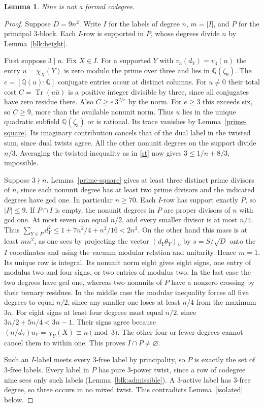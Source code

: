 \documentclass[11pt]{amsart}
\numberwithin{equation}{section}
\newtheorem{lemma}[theorem]{Lemma}
\begin{document}
\begin{lemma}\label{nine}
Nine is not a formal codegree.
\end{lemma}
\begin{proof}
Suppose $D=9n^2$. Write $I$ for the labels of degree $n$, $m=|I|$,
and $P$ for the principal 3-block. Each $I$-row is supported in $P$,
whose degrees divide $n$ by Lemma~\ref{blk:height}.

First suppose $3\mid n$. Fix $X\in I$. For a supported $Y$ with
$v_3(d_Y)=v_3(n)$ the entry $u=\chi_X(Y)$ is zero modulo the
prime over three and lies in $\mathbb Q(\zeta_9)$.
The $e=[\mathbb Q(u):\mathbb Q]$ conjugate entries occur at distinct
columns. For $u\ne0$ their total cost $C=\operatorname{Tr}(u\bar u)$
is a positive integer divisible by three, since all conjugates have
zero residue there. Also $C\ge e\,3^{2/e}$ by the norm. For $e\ge3$
this exceeds six, so $C\ge9$, more than the available nonunit norm.
Thus $u$ lies in the unique quadratic subfield $\mathbb Q(\zeta_3)$
or is rational. Its trace vanishes by Lemma~\ref{prime-square}.
Its imaginary contribution cancels that
of the dual label in the twisted sum, since dual twists agree.
All the other nonunit degrees on the support divide $n/3$.
Averaging the twisted inequality as in \eqref{st} now gives
$3\le1/n+8/3$, impossible.

Suppose $3\nmid n$. Lemma~\ref{prime-square} gives at least three
distinct prime divisors of $n$, since each nonunit degree has at
least two prime divisors and the indicated degrees have gcd one.
In particular $n\ge70$. Each $I$-row has support exactly $P$,
so $|P|\le9$. If $P\cap I$ is empty, the nonunit degrees in $P$
are proper divisors of $n$ with gcd one. At most seven can equal
$n/2$, and every smaller divisor is at most $n/4$. Thus
$\sum_{Y\in P}d_Y^2\le1+7n^2/4+n^2/16<2n^2$.
On the other hand this mass is at least $mn^2$, as one sees by projecting the vector
$(d_Y\theta_Y)_Y$ by $s=S/\sqrt D$ onto the $I$ coordinates and
using the vacuum modular relation and unitarity. Hence $m=1$.
Its unique row is integral. Its nonunit norm eight gives eight
signs, one entry of modulus two and four signs, or two entries of
modulus two. In the last case the two degrees have gcd one, whereas
two nonunits of $P$ have a nonzero crossing by their ternary
residues. In the middle case the modular inequality forces all
five degrees to equal $n/2$, since any smaller one loses at least
$n/4$ from the maximum $3n$. For eight signs at least four degrees
must equal $n/2$, since $3n/2+5n/4<3n-1$. Their signs agree because $(n/d_Y)u_Y=\chi_Y(X)\equiv n\pmod3$. The other four or fewer
degrees cannot cancel them to within one. This proves $I\cap P\ne\varnothing$.

Such an $I$-label meets every 3-free label by principality, so $P$
is exactly the set of 3-free labels. Every label in $P$ has pure
3-power twist, since a row of codegree nine sees only such labels
(Lemma~\ref{blk:admissible}). A 3-active label has 3-free degree,
so three occurs in no mixed twist. This contradicts Lemma~\ref{isolated} below.
\end{proof}
\end{document}
